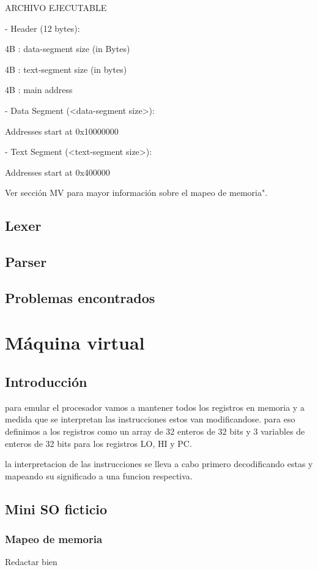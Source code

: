 \documentclass[12pt]{article}
\begin{document}
ARCHIVO EJECUTABLE

- Header (12 bytes):

    4B : data-segment size (in Bytes)

    4B : text-segment size (in bytes)

    4B : main address

- Data Segment (<data-segment size>):

    Addresses start at 0x10000000

- Text Segment (<text-segment size>):

    Addresses start at 0x400000

Ver sección MV para mayor información sobre el mapeo de memoria".

\subsection{Lexer}
\subsection{Parser}
\subsection{Problemas encontrados}
    
   
\section{Máquina virtual}
\subsection{Introducción}
para emular el procesador vamos a mantener todos los registros en memoria y a
medida que se interpretan las instrucciones estos van modificandose.
para eso definimos a los registros como un array de 32 enteros de 32 bits
y 3 variables de enteros de 32 bits para  los registros LO, HI y PC.

la interpretacion de las instrucciones se lleva a cabo primero decodificando
estas y mapeando su significado a una funcion respectiva.
\subsection{Mini SO ficticio}
\subsubsection{Mapeo de memoria}
Redactar bien
\end{document}
